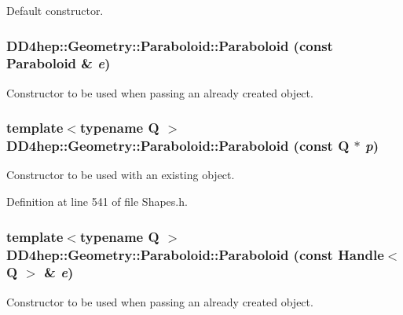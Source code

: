 Default constructor. \hypertarget{class_d_d4hep_1_1_geometry_1_1_paraboloid_a76b6c7202094152e36fdcd088c818898}{
\subsubsection[{Paraboloid}]{\setlength{\rightskip}{0pt plus 5cm}DD4hep::Geometry::Paraboloid::Paraboloid (const {\bf Paraboloid} \& {\em e})}}
\label{class_d_d4hep_1_1_geometry_1_1_paraboloid_a76b6c7202094152e36fdcd088c818898}


Constructor to be used when passing an already created object. \hypertarget{class_d_d4hep_1_1_geometry_1_1_paraboloid_af0eee2cf28b2701fa2e3829a8b60cadc}{
\subsubsection[{Paraboloid}]{\setlength{\rightskip}{0pt plus 5cm}template$<$typename Q $>$ DD4hep::Geometry::Paraboloid::Paraboloid (const Q $\ast$ {\em p})}}
\label{class_d_d4hep_1_1_geometry_1_1_paraboloid_af0eee2cf28b2701fa2e3829a8b60cadc}


Constructor to be used with an existing object. 

Definition at line 541 of file Shapes.h.\hypertarget{class_d_d4hep_1_1_geometry_1_1_paraboloid_ad20a769f56a02cef5d62a7795396cddc}{
\subsubsection[{Paraboloid}]{\setlength{\rightskip}{0pt plus 5cm}template$<$typename Q $>$ DD4hep::Geometry::Paraboloid::Paraboloid (const {\bf Handle}$<$ Q $>$ \& {\em e})}}
\label{class_d_d4hep_1_1_geometry_1_1_paraboloid_ad20a769f56a02cef5d62a7795396cddc}


Constructor to be used when passing an already created object. 

